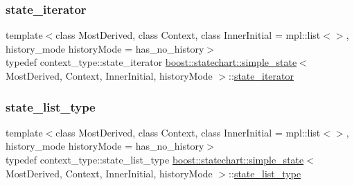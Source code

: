 \mbox{\label{classboost_1_1statechart_1_1simple__state_a32d30bbceb41ad02b70016d8530722a1}} 
\subsubsection{\texorpdfstring{state\+\_\+iterator}{state\_iterator}}
{\footnotesize\ttfamily template$<$class Most\+Derived, class Context, class Inner\+Initial = mpl\+::list$<$$>$, history\+\_\+mode history\+Mode = has\+\_\+no\+\_\+history$>$ \\
typedef context\+\_\+type\+::state\+\_\+iterator \mbox{\hyperlink{classboost_1_1statechart_1_1simple__state}{boost\+::statechart\+::simple\+\_\+state}}$<$ Most\+Derived, Context, Inner\+Initial, history\+Mode $>$\+::\mbox{\hyperlink{classboost_1_1statechart_1_1simple__state_a32d30bbceb41ad02b70016d8530722a1}{state\+\_\+iterator}}}

\mbox{\label{classboost_1_1statechart_1_1simple__state_a20858144ca2f7a2ce2965badb92ebdc3}} 
\subsubsection{\texorpdfstring{state\+\_\+list\+\_\+type}{state\_list\_type}}
{\footnotesize\ttfamily template$<$class Most\+Derived, class Context, class Inner\+Initial = mpl\+::list$<$$>$, history\+\_\+mode history\+Mode = has\+\_\+no\+\_\+history$>$ \\
typedef context\+\_\+type\+::state\+\_\+list\+\_\+type \mbox{\hyperlink{classboost_1_1statechart_1_1simple__state}{boost\+::statechart\+::simple\+\_\+state}}$<$ Most\+Derived, Context, Inner\+Initial, history\+Mode $>$\+::\mbox{\hyperlink{classboost_1_1statechart_1_1simple__state_a20858144ca2f7a2ce2965badb92ebdc3}{state\+\_\+list\+\_\+type}}}

\mbox{\label{classboost_1_1statechart_1_1simple__state_ab912b321d44a14521b3c80e11fb919e1}} 
